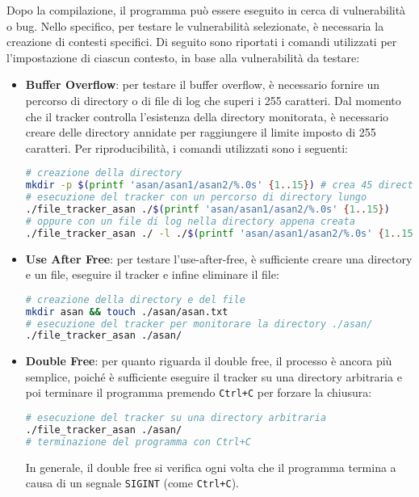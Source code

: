 Dopo la compilazione, il programma può essere eseguito in cerca di vulnerabilità
o bug. Nello specifico, per testare le vulnerabilità selezionate, è necessaria la
creazione di contesti specifici. Di seguito sono riportati i comandi utilizzati
per l'impostazione di ciascun contesto, in base alla vulnerabilità da testare:
\begin{itemize}
  \item \textbf{Buffer Overflow}: per testare il buffer overflow, è necessario
    fornire un percorso di directory o di file di log che superi i 255 caratteri.
    Dal momento che il tracker controlla l'esistenza della directory monitorata,
    è necessario creare delle directory annidate per raggiungere il limite
    imposto di 255 caratteri. Per riproducibilità, i comandi utilizzati sono i
    seguenti: \begin{lstlisting}[language=bash, numbers=none]
# creazione della directory
mkdir -p $(printf 'asan/asan1/asan2/%.0s' {1..15}) # crea 45 directory annidate
# esecuzione del tracker con un percorso di directory lungo
./file_tracker_asan ./$(printf 'asan/asan1/asan2/%.0s' {1..15})
# oppure con un file di log nella directory appena creata
./file_tracker_asan ./ -l ./$(printf 'asan/asan1/asan2/%.0s' {1..15})logfile.log
    \end{lstlisting}

  \item \textbf{Use After Free}: per testare l'use-after-free, è sufficiente
    creare una directory e un file, eseguire il tracker e infine eliminare il file:
    \begin{lstlisting}[language=bash, numbers=none]
# creazione della directory e del file
mkdir asan && touch ./asan/asan.txt
# esecuzione del tracker per monitorare la directory ./asan/
./file_tracker_asan ./asan/
    \end{lstlisting}

  \item \textbf{Double Free}: per quanto riguarda il double free, il processo è
    ancora più semplice, poiché è sufficiente eseguire il tracker su una directory
    arbitraria e poi terminare il programma premendo \texttt{Ctrl+C} per forzare
    la chiusura: \begin{lstlisting}[language=bash, numbers=none]
# esecuzione del tracker su una directory arbitraria
./file_tracker_asan ./asan/
# terminazione del programma con Ctrl+C
    \end{lstlisting}
    In generale, il double free si verifica ogni volta che il programma termina
    a causa di un segnale \texttt{SIGINT} (come \texttt{Ctrl+C}).
\end{itemize}


